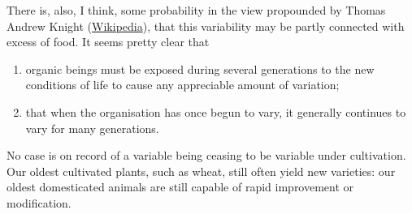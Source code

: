 There is, also, I think, some probability in the view propounded by Thomas Andrew Knight (\href{http://www.wikipedia.org/}{Wikipedia}), that this variability may be partly connected with excess of food. It seems pretty clear that

\begin{enumerate}
\item organic beings must be exposed during several generations to the new conditions of life to cause any appreciable amount of variation;
\item that when the organisation has once begun to vary, it generally continues to vary for many generations.
\end{enumerate}

No case is on record of a variable being ceasing to be variable under cultivation. Our oldest cultivated plants, such as wheat, still often yield new varieties: our oldest domesticated animals are still capable of rapid improvement or modification.